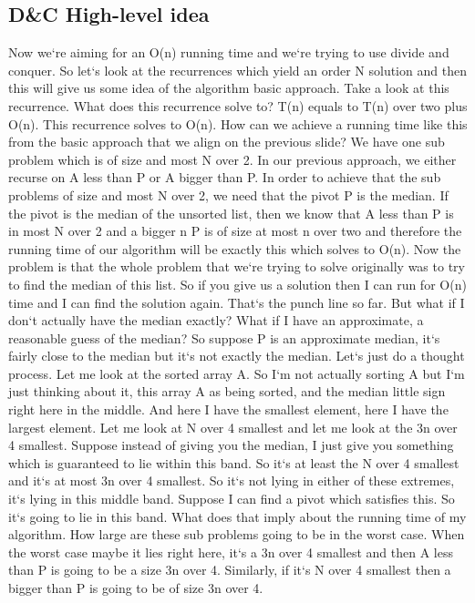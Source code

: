 \subsection{D\&C  High-level idea}
Now we`re aiming for an O(n) running time and we`re trying to use divide and conquer.
So let`s look at the recurrences which yield an order N solution and then this will give us some idea of the algorithm basic approach.
Take a look at this recurrence.
What does this recurrence solve to? T(n) equals to T(n) over two plus O(n).
This recurrence solves to O(n).
How can we achieve a running time like this from the basic approach that we align on the previous slide? We have one sub problem which is of size and most N over 2.
In our previous approach, we either recurse on A less than P or A bigger than P\@.
In order to achieve that the sub problems of size and most N over 2, we need that the pivot P is the median.
If the pivot is the median of the unsorted list, then we know that A less than P is in most N over 2 and a bigger n P is of size at most n over two and therefore the running time of our algorithm will be exactly this which solves to O(n).
Now the problem is that the whole problem that we`re trying to solve originally was to try to find the median of this list.
So if you give us a solution then I can run for O(n) time and I can find the solution again.
That`s the punch line so far.
But what if I don`t actually have the median exactly? What if I have an approximate, a reasonable guess of the median? So suppose P is an approximate median, it`s fairly close to the median but it`s not exactly the median.
Let`s just do a thought process.
Let me look at the sorted array A\@.
So I`m not actually sorting A but I`m just thinking about it, this array A as being sorted, and the median little sign right here in the middle.
And here I have the smallest element, here I have the largest element.
Let me look at N over 4 smallest and let me look at the 3n over 4 smallest.
Suppose instead of giving you the median, I just give you something which is guaranteed to lie within this band.
So it`s at least the N over 4 smallest and it`s at most 3n over 4 smallest.
So it`s not lying in either of these extremes, it`s lying in this middle band.
Suppose I can find a pivot which satisfies this.
So it`s going to lie in this band.
What does that imply about the running time of my algorithm.
How large are these sub problems going to be in the worst case.
When the worst case maybe it lies right here, it`s a 3n over 4 smallest and then A less than P is going to be a size 3n over 4.
Similarly, if it`s N over 4 smallest then a bigger than P is going to be of size 3n over 4.

